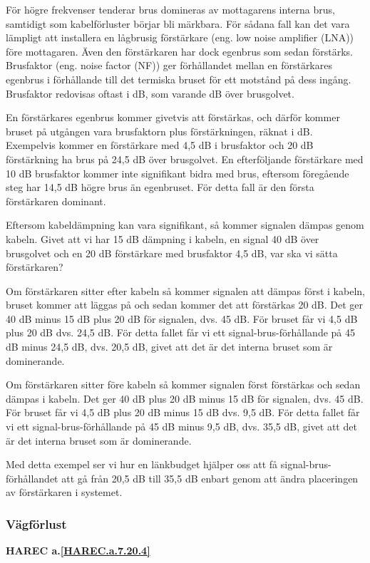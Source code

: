 För högre frekvenser tenderar brus domineras av mottagarens interna brus,
samtidigt som kabelförluster börjar bli märkbara.
För sådana fall kan det vara lämpligt att installera en lågbrusig förstärkare
(eng. low noise amplifier (LNA)) före mottagaren.
Även den förstärkaren har dock egenbrus som sedan förstärks.
Brusfaktor (eng. noise factor (NF)) ger förhållandet mellan en förstärkares
egenbrus i förhållande till det termiska bruset för ett motstånd på dess
ingång. Brusfaktor redovisas oftast i dB, som varande dB över brusgolvet.

En förstärkares egenbrus kommer givetvis att förstärkas, och därför kommer
bruset på utgången vara brusfaktorn plus förstärkningen, räknat i dB.
Exempelvis kommer en förstärkare med 4,5 dB i brusfaktor och 20 dB förstärkning
ha brus på 24,5 dB över brusgolvet.
En efterföljande förstärkare med 10 dB brusfaktor kommer inte signifikant
bidra med brus, eftersom föregående steg har 14,5 dB högre brus än egenbruset.
För detta fall är den första förstärkaren dominant.

Eftersom kabeldämpning kan vara signifikant, så kommer signalen dämpas genom
kabeln.
Givet att vi har 15 dB dämpning i kabeln, en signal 40 dB över brusgolvet och
en 20 dB förstärkare med brusfaktor 4,5 dB, var ska vi sätta förstärkaren?

Om förstärkaren sitter efter kabeln så kommer signalen att dämpas först i
kabeln, bruset kommer att läggas på och sedan kommer det att förstärkas 20 dB.
Det ger 40 dB minus 15 dB plus 20 dB för signalen, dvs. 45 dB.
För bruset får vi 4,5 dB plus 20 dB dvs. 24,5 dB.
För detta fallet får vi ett signal-brus-förhållande på 45 dB minus 24,5 dB,
dvs. 20,5 dB, givet att det är det interna bruset som är dominerande.

Om förstärkaren sitter före kabeln så kommer signalen först förstärkas och
sedan dämpas i kabeln.
Det ger 40 dB plus 20 dB minus 15 dB för signalen, dvs. 45 dB.
För bruset får vi 4,5 dB plus 20 dB minus 15 dB dvs. 9,5 dB.
För detta fallet får vi ett signal-brus-förhållande på 45 dB minus 9,5 dB,
dvs. 35,5 dB, givet att det är det interna bruset som är dominerande.

Med detta exempel ser vi hur en länkbudget hjälper oss att få
signal-brus-förhållandet att gå från 20,5 dB till 35,5 dB enbart genom att
ändra placeringen av förstärkaren i systemet.

\subsubsection{Vägförlust}
\textbf{HAREC a.\ref{HAREC.a.7.20.4}\label{myHAREC.a.7.20.4}}

